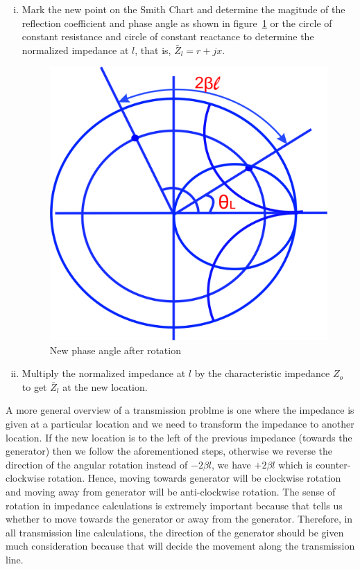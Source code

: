 \begin{enumerate}[(i)]
\item Mark the new point on the Smith Chart and determine the magitude of the reflection coefficient and phase angle as shown in figure~\ref{fig:uyhbgjvkclxse} or the circle of constant resistance and circle of constant reactance to determine the normalized impedance at $l$, that is, $\bar{Z}_{l} = r + jx$.
\begin{figure}[h]
\centering
\includegraphics[width=0.7\linewidth]{./graphics/uyhbgjvkclxse}
\caption{New phase angle after rotation}
\label{fig:uyhbgjvkclxse}
\end{figure}

\item Multiply the normalized impedance at $l$ by the characteristic impedance $Z_o$ to get $\bar{Z}_{l}$ at the new location.
\end{enumerate}

A more general overview of a transmission problme is one where the impedance is given at a particular location and we need to transform the impedance to another location. If the new location is to the left of the previous impedance (towards the generator) then we follow the aforementioned steps, otherwise we reverse the direction of the angular rotation instead of $-2\beta{l}$, we have $+2\beta{l}$ which is counter-clockwise rotation. Hence, moving towards generator will be clockwise rotation and moving away from generator will be anti-clockwise rotation. The sense of rotation in impedance calculations is extremely important because that tells us whether to move towards the generator or away from the generator. Therefore, in all transmission line calculations, the direction of the generator should be given much consideration because that will decide the movement along the transmission line.

